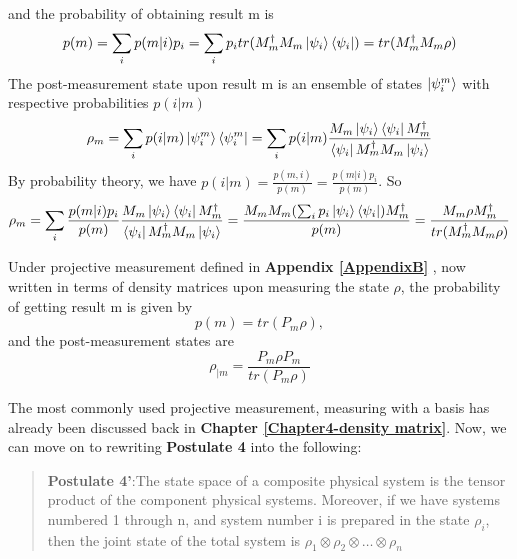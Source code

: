     and the probability of obtaining result m is
    \begin{equation}
        p(m)=\sum_i p(m|i)p_i=\sum_i p_i tr(M_m^\dagger M_m \ket{\psi_i}\bra{\psi_i})=tr(M_m^\dagger M_m \rho)
    \end{equation}
    The post-measurement state upon result m is an ensemble of states $\ket{\psi_i^m}$ with respective probabilities $p(i|m)$
    \begin{equation}
        \rho_m = \sum_i p(i|m)\ket{\psi_i^m}\bra{\psi_i^m}=\sum_i p(i|m)\frac{M_m \ket{\psi_i}\bra{\psi_i}M_m^\dagger}{\bra{\psi_i}M_m^\dagger M_m \ket{\psi_i}}
    \end{equation}
    By probability theory, we have $p(i|m)=\frac{p(m,i)}{p(m)}=\frac{p(m|i)p_i}{p(m)}$. So
    \begin{equation}
        \rho_m=\sum_i \frac{p(m|i)p_i}{p(m)}\frac{M_m \ket{\psi_i}\bra{\psi_i}M_m^\dagger}{\bra{\psi_i}M_m^\dagger M_m \ket{\psi_i}}=\frac{M_m M_m (\sum_i p_i \ket{\psi_i}\bra{\psi_i})M_m^\dagger}{p(m)}=\frac{M_m \rho M_m^\dagger}{tr(M_m^\dagger M_m \rho)}
    \end{equation}

\bigskip
Under projective measurement defined in \textbf{Appendix \ref{AppendixB}}
, now written in terms of density matrices upon measuring the state $\rho$, the probability of getting result m is given by
\begin{equation}
    p(m)=tr(P_m \rho),
\end{equation}
and the post-measurement states are
\begin{equation}
    \rho_{|m}=\frac{P_m \rho P_m}{tr(P_m \rho)}
\end{equation}

The most commonly used projective measurement, measuring with a basis has already been discussed back in \textbf{Chapter \ref{Chapter4-density matrix}}. Now, we can move on to rewriting \textbf{Postulate 4} into the following:

\bigskip
\begin{quote}
    \textbf{Postulate 4'}:The state space of a composite physical system is the tensor product of the component physical systems. Moreover, if we have systems numbered 1 through n, and system number i is prepared in the state $\rho_i$, then the joint state of the total system is $\rho_1 \otimes \rho_2 \otimes \hdots \otimes \rho_n$
\end{quote}



